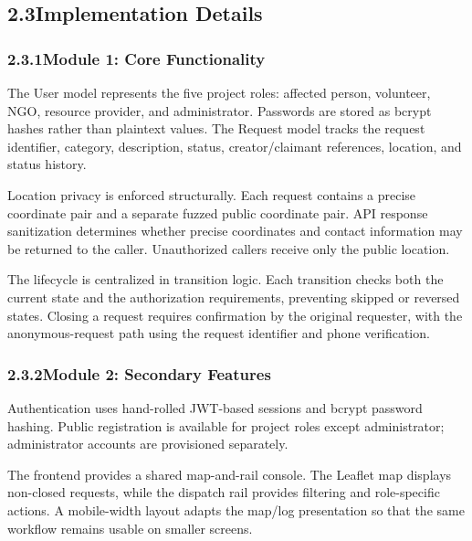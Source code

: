 \documentclass[11pt,a4paper]{article}
\begin{document}
\newpage

\subsection{2.3\quad Implementation Details}

\subsubsection{2.3.1\quad Module 1: Core Functionality}

The User model represents the five project roles: affected person, volunteer, NGO, resource provider, and administrator. Passwords are stored as bcrypt hashes rather than plaintext values. The Request model tracks the request identifier, category, description, status, creator/claimant references, location, and status history.

Location privacy is enforced structurally. Each request contains a precise coordinate pair and a separate fuzzed public coordinate pair. API response sanitization determines whether precise coordinates and contact information may be returned to the caller. Unauthorized callers receive only the public location.

The lifecycle is centralized in transition logic. Each transition checks both the current state and the authorization requirements, preventing skipped or reversed states. Closing a request requires confirmation by the original requester, with the anonymous-request path using the request identifier and phone verification.

\subsubsection{2.3.2\quad Module 2: Secondary Features}

Authentication uses hand-rolled JWT-based sessions and bcrypt password hashing. Public registration is available for project roles except administrator; administrator accounts are provisioned separately.

The frontend provides a shared map-and-rail console. The Leaflet map displays non-closed requests, while the dispatch rail provides filtering and role-specific actions. A mobile-width layout adapts the map/log presentation so that the same workflow remains usable on smaller screens.
\end{document}
